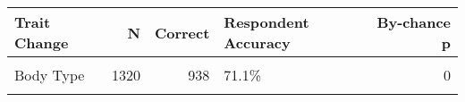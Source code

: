 \begin{table}[!h]

\caption{}
\centering
\fontsize{10}{12}\selectfont
\begin{tabular}[t]{lrrlr}
\toprule
Trait Change & N & Correct & Respondent Accuracy & By-chance p\\
\midrule
\cellcolor{gray!6}{Gender} & \cellcolor{gray!6}{311} & \cellcolor{gray!6}{222} & \cellcolor{gray!6}{71.4\%} & \cellcolor{gray!6}{0}\\
Body Type & 1320 & 938 & 71.1\% & 0\\
\cellcolor{gray!6}{Race or ethnicity} & \cellcolor{gray!6}{934} & \cellcolor{gray!6}{662} & \cellcolor{gray!6}{70.9\%} & \cellcolor{gray!6}{0}\\
\bottomrule
\end{tabular}
\end{table}
